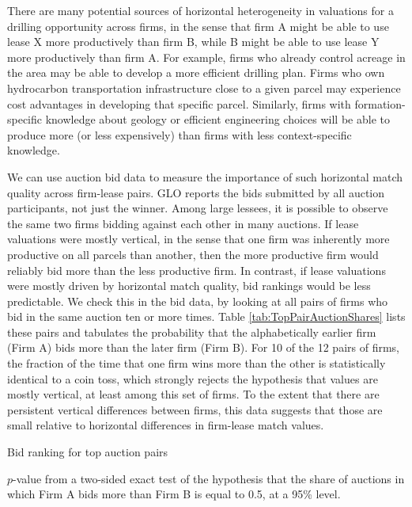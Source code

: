 \documentclass[12pt]{article}
\begin{document}
There are many potential sources of horizontal heterogeneity in valuations for a drilling opportunity across firms, in the sense that firm A might be able to use lease X more productively than firm B, while B might be able to use lease Y more productively than firm A. For example, firms who already control acreage in the area may be able to develop a more efficient drilling plan. Firms who own hydrocarbon transportation infrastructure close to a given parcel may experience cost advantages in developing that specific parcel.  Similarly, firms with formation-specific knowledge about geology or efficient engineering choices will be able to produce more (or less expensively) than firms with less context-specific knowledge.

We can use auction bid data to measure the importance of such horizontal match quality across firm-lease pairs. GLO reports the bids submitted by all auction participants, not just the winner. Among large lessees, it is possible to observe the same two firms bidding against each other in many auctions.  If lease valuations were mostly vertical, in the sense that one firm was inherently more productive on all parcels than another, then the more productive firm would  reliably bid more than the less productive firm.  In contrast, if lease valuations were mostly driven by horizontal match quality, bid rankings would be less predictable. We check this in the bid data, by looking at all pairs of firms who bid in the same auction ten or more times.  Table \ref{tab:TopPairAuctionShares} lists these pairs and tabulates the probability that the alphabetically earlier firm (Firm A) bids more than the later firm (Firm B).  For 10 of the 12 pairs of firms, the fraction of the time that one firm wins more than the other is statistically identical to a coin toss, which strongly rejects the hypothesis that values are mostly vertical, at least among this set of firms.  To the extent that there are persistent vertical differences between firms, this data suggests that those are small relative to horizontal differences in firm-lease match values.  

\begin{table}[htbp]
	\begin{center}
	\begin{threeparttable}
		\caption{Bid ranking for top auction pairs}
		\label{tab:TopPairAuctionShares}
		\small
		            
		\begin{tablenotes}
			\footnotesize
			\item $p$-value from a two-sided exact test of the hypothesis that the share of auctions in which Firm A bids more than Firm B is equal to 0.5, at a 95\% level.   
			\end{tablenotes}        
	\end{threeparttable}
	\end{center}
\end{table}
\end{document}
